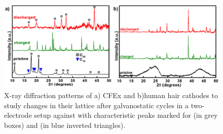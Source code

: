 \begin{figure}[h!]
  \centering
  \includegraphics[width=\textwidth]{Figures/chap5fig/XRD}
    \caption{X-ray diffraction patterns of a) CFEx and b)human hair cathodes to study changes in their lattice after galvanostatic cycles in a two-electrode setup against  with characteristic peaks marked for  (in grey boxes) and  (in blue inverted triangles).}
  \label{Figures/chap5fig:XRD}
\end{figure}

